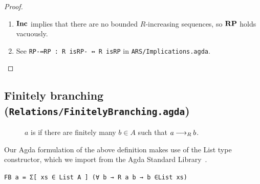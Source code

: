 \begin{proof} \hfill
    \begin{enumerate}
        \item $\mathbf{Inc}$ implies that there are no bounded $R$-increasing sequences,
        so $\mathbf{RP}$ holds vacuously.
        \item See \verb|RP-↔RP : R isRP- ↔ R isRP| in \texttt{ARS/Implications.agda}. \qedhere
    \end{enumerate}
\end{proof}

\subsection{Finitely branching (\texttt{Relations/FinitelyBranching.agda})}

\begin{definition} \hfill
    \begin{description}
        \item[\bq {}] $a$ is  if there are finitely many $b \in A$ such that $a \mathbin{\longrightarrow_R} b$.
    \end{description}
\end{definition}

Our Agda formulation of the above definition makes use of the List type constructor, which we import from the Agda Standard Library~\cite{AgdaLibraryList}.


\verb|FB a = Σ[ xs ∈ List A ] (∀ b → R a b → b ∈List xs)|


